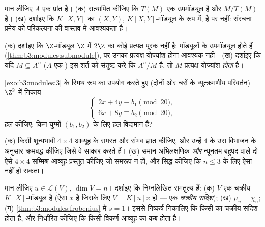 \begin{exercise}[$\star\star$]\label{exo:b3:modules:5}
मान लीजिए $A$ एक प्रांत है। (क) सत्यापित कीजिए कि $T(M)$ एक
उपमॉड्यूल है और $M/T(M)$  है। (ख) दर्शाइए कि $K[X,Y]$ का
 $(X, Y)$, $K[X,Y]$-मॉड्यूल के रूप में,  है पर 
नहीं: संरचना प्रमेय को  परिकल्पना की वास्तव में आवश्यकता है।
\end{exercise}

\begin{exercise}[$\star\star$]\label{exo:b3:modules:6}
(क) दर्शाइए कि $\Z$-मॉड्यूल $\Z$ में $2\Z$ का कोई प्रत्यक्ष
पूरक नहीं है:  मॉड्यूलों के उपमॉड्यूल  होते हैं
(\cref{thm:b3:modules:submodule}), पर उनका प्रत्यक्ष योज्यांश होना आवश्यक नहीं। (ख)
दर्शाइए कि यदि $M \subseteq A^n$ ($A$ एक ) इस शर्त को संतुष्ट करे कि
$A^n/M$  है, तो $M$ प्रत्यक्ष योज्यांश \emph{होता}
है।
\end{exercise}

\begin{exercise}[$\star\star$]\label{exo:b3:modules:7}
\cref{exo:b3:modules:3} के स्मिथ रूप का उपयोग करते हुए (दोनों ओर चरों के
व्युत्क्रमणीय परिवर्तन) $\Z^2$ में निकाय
\[
\begin{cases}
2x + 4y \equiv b_1 \pmod{20},\\
6x + 8y \equiv b_2 \pmod{20},
\end{cases}
\]
हल कीजिए: किन युग्मों $(b_1, b_2)$ के लिए हल विद्यमान हैं?
\end{exercise}

\begin{exercise}[$\star\star$]\label{exo:b3:modules:8}
(क) किसी शून्यभावी $4 \times 4$ आव्यूह के समस्त  और
संभव  ज्ञात कीजिए, और उन्हें $4$ के उस विभाजन के
अनुसार क्रमबद्ध कीजिए जिसे वे साकार करते हैं।
(ख) समान अभिलक्षणिक \emph{और} न्यूनतम बहुपद वाले दो ऐसे $4\times4$
सम्मिश्र आव्यूह प्रस्तुत कीजिए जो समरूप न हों, और सिद्ध कीजिए कि
$n \leq 3$ के लिए ऐसा नहीं हो सकता।
\end{exercise}

\begin{exercise}[$\star\star\star$]\label{exo:b3:modules:9}
मान लीजिए $u \in \mathcal L(V)$, $\dim V = n$। दर्शाइए कि निम्नलिखित समतुल्य हैं:
(क) $V$ एक चक्रीय $K[X]$-मॉड्यूल है (ऐसा $x$ है जिसके लिए
$V = K[u]x$ हो --- एक \emph{चक्रीय सदिश}); (ख) $\mu_u = \chi_u$; (ग) \cref{thm:b3:modules:frobenius} में
$s = 1$। इससे निष्कर्ष निकालिए कि किसी  का चक्रीय सदिश
होता है, और निर्धारित कीजिए कि किसी विकर्ण आव्यूह का कब होता है।
\end{exercise}

